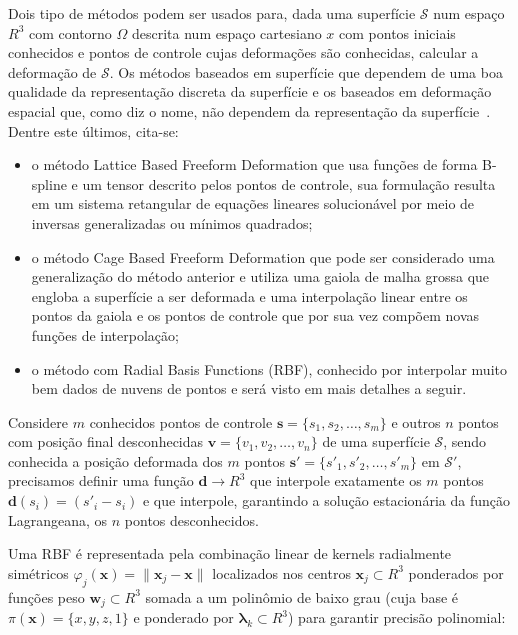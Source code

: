 Dois tipo de métodos podem ser usados para, dada uma superfície $\mathcal{S}$ num espaço $R^3$ com contorno $\Omega$ descrita num espaço cartesiano $x$ com pontos iniciais conhecidos e pontos de controle cujas deformações são conhecidas, calcular a deformação de $\mathcal{S}$. Os métodos baseados em superfície que dependem de uma boa qualidade da representação discreta da superfície e os baseados em deformação espacial que, como diz o nome, não dependem da representação da superfície~\cite{Botsch}. Dentre este últimos, cita-se: 

\renewcommand{\labelitemi}{•}
\begin{itemize}
  \item o método Lattice Based Freeform Deformation que usa funções de forma B-spline e um tensor descrito pelos pontos de controle, sua formulação resulta em um sistema retangular de equações lineares solucionável por meio de inversas generalizadas ou mínimos quadrados;
  \item o método Cage Based Freeform Deformation que pode ser considerado uma generalização do método anterior e utiliza uma gaiola de malha grossa que engloba a superfície a ser deformada e uma interpolação linear entre os pontos da gaiola e os pontos de controle que por sua vez compõem novas funções de interpolação;
  \item o método com Radial Basis Functions (RBF), conhecido por interpolar muito bem dados de nuvens de pontos e será visto em mais detalhes a seguir.
\end{itemize}

Considere $m$ conhecidos pontos de controle $\boldsymbol{s}=\{s_1, s_2, \ldots, s_m\}$ e outros $n$ pontos com posição final desconhecidas $\boldsymbol{v}=\{v_1, v_2, \ldots, v_n\}$ de uma superfície $\mathcal{S}$, sendo conhecida a posição deformada dos $m$ pontos $\boldsymbol{s'}=\{s'_1, s'_2, \ldots, s'_m\}$ em $\mathcal{S}'$, precisamos definir uma função $\boldsymbol{d}\to R^3$ que interpole exatamente os $m$ pontos $\boldsymbol{d}(s_i)=(s'_i-s_i)$ e que interpole, garantindo a solução estacionária da função Lagrangeana, os $n$ pontos desconhecidos.

Uma RBF é representada pela combinação linear de kernels radialmente simétricos $\varphi_j(\boldsymbol{x})=\lVert\boldsymbol{x}_j-\boldsymbol{x}\rVert$ localizados nos centros $\boldsymbol{x}_j\subset R^3$ ponderados por funções peso $\boldsymbol{w}_j\subset R^3$ somada a um polinômio de baixo grau (cuja base é $\pi(\boldsymbol{x})=\{x,y,z,1\}$ e ponderado por $\boldsymbol{\lambda}_k\subset R^3$) para garantir precisão polinomial:

